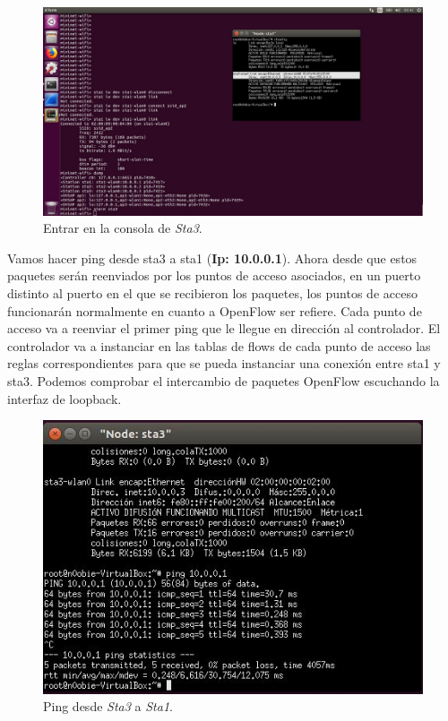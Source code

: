 \begin{figure}[!htb]
  \centering
    \includegraphics[width=\linewidth]{./img/14.JPG}
    \caption{Entrar en la consola de \textit{Sta3}.}
  \label{fig:yo}
\end{figure}
\newline
Vamos hacer ping desde sta3 a sta1 (\textbf{Ip: 10.0.0.1}). Ahora desde que estos paquetes serán reenviados por los puntos de acceso asociados, en un puerto distinto al puerto
en el que se recibieron los paquetes, los puntos de acceso funcionarán normalmente en cuanto a OpenFlow ser refiere. Cada punto de acceso va a reenviar el primer ping que le llegue en dirección al controlador. El controlador va a instanciar en las tablas de flows de cada punto de acceso las reglas correspondientes para que se pueda instanciar una conexión entre sta1 y sta3. \newline
\newline
Podemos comprobar el intercambio de paquetes OpenFlow escuchando la interfaz de loopback.
\newpage
\begin{figure}[!htb]
  \centering
    \includegraphics[width=0.8\linewidth]{./img/15.JPG}
    \caption{Ping desde \textit{Sta3} a \textit{Sta1}.}
  \label{fig:yo}
\end{figure}
